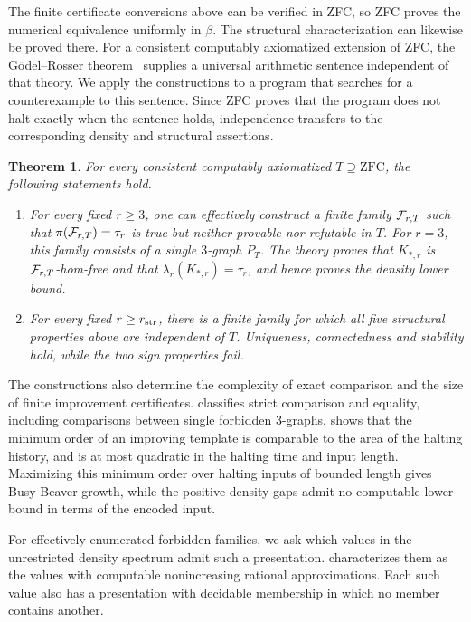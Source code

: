 \documentclass[10pt]{article}
\numberwithin{equation}{section}
\newtheorem{theorem}{Theorem}[section]
\theoremstyle{definition}
\begin{document}
The finite certificate conversions above can be verified in ZFC, so ZFC proves the numerical equivalence uniformly in $\beta$. The structural characterization can likewise be proved there. For a consistent computably axiomatized extension of ZFC, the G\"odel--Rosser theorem~\cite{Rosser1936} supplies a universal arithmetic sentence independent of that theory. We apply the constructions to a program that searches for a counterexample to this sentence. Since ZFC proves that the program does not halt exactly when the sentence holds, independence transfers to the corresponding density and structural assertions.
\begin{theorem}\label{thm:independence}
For every consistent computably axiomatized $T\supseteq\mathrm{ZFC}$, the following statements hold.
\begin{enumerate}
\item For every fixed $r\ge3$, one can effectively construct a finite family $\mathcal F_{r,T}$ such that $\pi(\mathcal F_{r,T})=\tau_r$ is true but neither provable nor refutable in $T$. For $r=3$, this family consists of a single $3$-graph $P_T$. The theory proves that $K_{*,r}$ is $\mathcal F_{r,T}$-hom-free and that $\lambda_r(K_{*,r})=\tau_r$, and hence proves the density lower bound.
\item For every fixed $r\ge r_{\rm str}$, there is a finite family for which all five structural properties above are independent of $T$. Uniqueness, connectedness and stability hold, while the two sign properties fail.
\end{enumerate}
\end{theorem}
The constructions also determine the complexity of exact comparison and the size of finite improvement certificates.  classifies strict comparison and equality, including comparisons between single forbidden $3$-graphs.  shows that the minimum order of an improving template is comparable to the area of the halting history, and is at most quadratic in the halting time and input length. Maximizing this minimum order over halting inputs of bounded length gives Busy-Beaver growth, while the positive density gaps admit no computable lower bound in terms of the encoded input.

For effectively enumerated forbidden families, we ask which values in the unrestricted density spectrum admit such a presentation.  characterizes them as the values with computable nonincreasing rational approximations. Each such value also has a presentation with decidable membership in which no member contains another.
\end{document}
